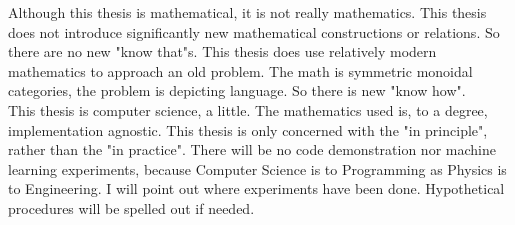 Although this thesis is mathematical, it is not really mathematics.
This thesis does not introduce significantly new mathematical constructions or relations.
So there are no new "know that"s.
This thesis does use relatively modern mathematics to approach an old problem.
The math is symmetric monoidal categories, the problem is depicting language.
So there is new "know how".\\

This thesis is computer science, a little.
The mathematics used is, to a degree, implementation agnostic.
This thesis is only concerned with the "in principle", rather than the "in practice".
There will be no code demonstration nor machine learning experiments, because
Computer Science is to Programming as Physics is to Engineering.
I will point out where experiments have been done.
Hypothetical procedures will be spelled out if needed.